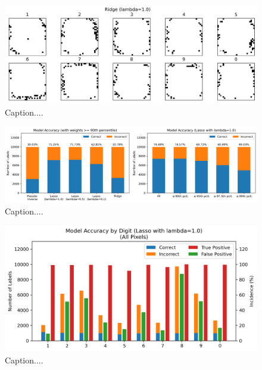 \documentclass[10pt]{article}
\begin{document}
\begin{figure}[ht]
\centerline{\includegraphics[scale=0.75]{figures/weight_matrix_ridge_geq_90th_no_zeros.png}}
\caption{Caption....}
\label{fig19}
\end{figure}

\begin{figure}[ht]
\centerline{\includegraphics[scale=0.6]{figures/most_important_pixels_90th_accuracy.png}}
\caption{Caption....}
\label{fig20}
\end{figure}

\begin{figure}[ht]
\centerline{\includegraphics[scale=0.85]{figures/DIGIT_ALL_PIXELS_lasso_accuracy_comparison.png}}
\caption{Caption....}
\label{fig21}
\end{figure}
\end{document}
